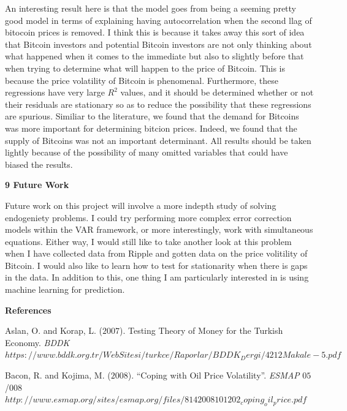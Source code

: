 \documentclass{article}[10 pt]
\newcommand{\vs}{\vspace{0.1in}}
\begin{document}
\vs

An interesting result here is that the model goes from being a seeming
pretty good model in terms of explaining having autocorrelation when the
second llag of bitocoin prices is removed. I think this is because it takes
away this sort of idea that Bitcoin investors and potential Bitcoin
investors are not only thinking about what happened when it comes to the
immediate but also to slightly before that when trying to determine what
will happen to the price of Bitcoin. This is because the price volatility
of Bitcoin is phenomenal. Furthermore, these regressions have very large
$R^2$ values, and it should be determined whether or not their residuals
are stationary so as to reduce the possibility that these regressions are
spurious. Similiar to the literature, we found that the demand for Bitcoins
was more important for determining bitcion prices. Indeed, we found that
the supply of Bitcoins was not an important determinant. All results should
be taken lightly because of the possibility of many omitted variables that
could have biased the results.

\vs

\textbf{9 Future Work}

\vs

Future work on this project will involve a more indepth study of solving
endogeniety problems. I could try performing more complex error correction
models within the VAR framework, or more interestingly, work with
simultaneous equations. Either way, I would still like to take another look
at this problem when I have collected data from Ripple and gotten data on
the price volitility of Bitcoin. I would also like to learn how to test for
stationarity when there is gaps in the data. In addition to this, one thing
I am particularly interested in is using machine learning for prediction. 

\newpage

\begin{center}

\textbf{References}

\end{center}

\vspace{5mm}

Aslan, O. and Korap, L. ($2007$). Testing Theory of Money for the Turkish
Economy. \textit{BDDK}
$https://www.bddk.org.tr/WebSitesi/turkce/Raporlar/BDDK_Dergi/4212Makale-5.pdf$

\vs

Bacon, R. and Kojima, M. ($2008$). “Coping with Oil Price Volatility”.
\textit{ESMAP} $05$/$008$
$http://www.esmap.org/sites/esmap.org/files/8142008101202_coping_oil_price.pdf$ 
\end{document}
